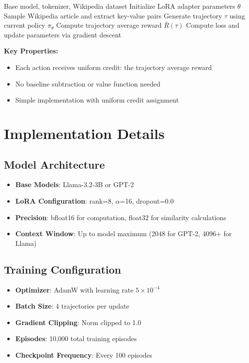 \documentclass[11pt]{article}
\begin{document}
\begin{algorithm}
\caption{Chain Rule Policy Gradient Training}
\begin{algorithmic}[1]
\REQUIRE Base model, tokenizer, Wikipedia dataset
\STATE Initialize LoRA adapter parameters $\theta$
    \STATE Sample Wikipedia article and extract key-value pairs
    \STATE Generate trajectory $\tau$ using current policy $\pi_\theta$
    \STATE Compute trajectory average reward $\bar{R}(\tau)$
    \STATE Compute loss and update parameters via gradient descent
\ENDFOR
\end{algorithmic}
\end{algorithm}

\textbf{Key Properties:}
\begin{itemize}
    \item Each action receives uniform credit: the trajectory average reward
    \item No baseline subtraction or value function needed
    \item Simple implementation with uniform credit assignment
\end{itemize}

\section{Implementation Details}

\subsection{Model Architecture}
\begin{itemize}
    \item \textbf{Base Models}: Llama-3.2-3B or GPT-2
    \item \textbf{LoRA Configuration}: rank=8, $\alpha$=16, dropout=0.0
    \item \textbf{Precision}: bfloat16 for computation, float32 for similarity calculations
    \item \textbf{Context Window}: Up to model maximum (2048 for GPT-2, 4096+ for Llama)
\end{itemize}

\subsection{Training Configuration}
\begin{itemize}
    \item \textbf{Optimizer}: AdamW with learning rate $5 \times 10^{-4}$
    \item \textbf{Batch Size}: 4 trajectories per update
    \item \textbf{Gradient Clipping}: Norm clipped to 1.0
    \item \textbf{Episodes}: 10,000 total training episodes
    \item \textbf{Checkpoint Frequency}: Every 100 episodes
\end{itemize}
\end{document}
